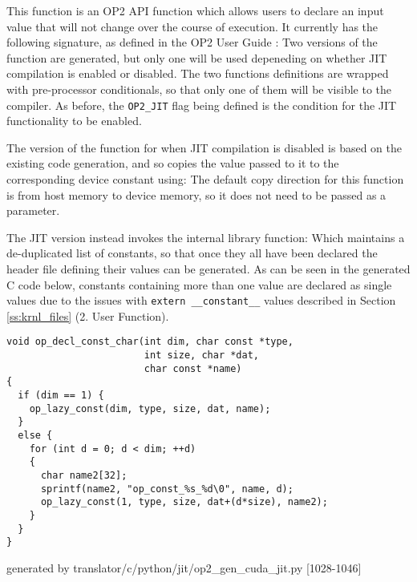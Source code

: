 This function is an OP2 API function which allows users to declare an input value that will not change over the course of execution. It currently has the following signature, as defined in the OP2 User Guide \cite[p9]{manual}:
 Two versions of the function are generated, but only one will be used depeneding on whether JIT compilation is enabled or disabled. The two functions definitions are wrapped with pre-processor conditionals, so that only one of them will be visible to the compiler. As before, the \verb|OP2_JIT| flag being defined is the condition for the JIT functionality to be enabled.


\par
The version of the function for when JIT compilation is disabled is based on the existing code generation, and so copies the value passed to it to the corresponding device constant using:
\noindent The default copy direction for this function is from host memory to device memory, so it does not need to be passed as a parameter.
\par
The JIT version instead invokes the internal library function:
Which maintains a de-duplicated list of constants, so that once they all have been declared the header file defining their values can be generated. As can be seen in the generated C code below, constants containing more than one value are declared as single values due to the issues with \verb|extern __constant__| values described in Section \ref{ss:krnl_files} (2. User Function).
\begin{lstlisting}[linewidth = \textwidth, framesep=0pt]
void op_decl_const_char(int dim, char const *type,
                        int size, char *dat,
                        char const *name)
{
  if (dim == 1) {
    op_lazy_const(dim, type, size, dat, name);
  }
  else {
    for (int d = 0; d < dim; ++d)
    {
      char name2[32];
      sprintf(name2, "op_const_%s_%d\0", name, d);
      op_lazy_const(1, type, size, dat+(d*size), name2);
    }
  }
}
\end{lstlisting}
\vspace{-1em}
\hspace*{\fill}\footnotesize{generated by translator/c/python/jit/op2\_gen\_cuda\_jit.py [1028-1046]}

